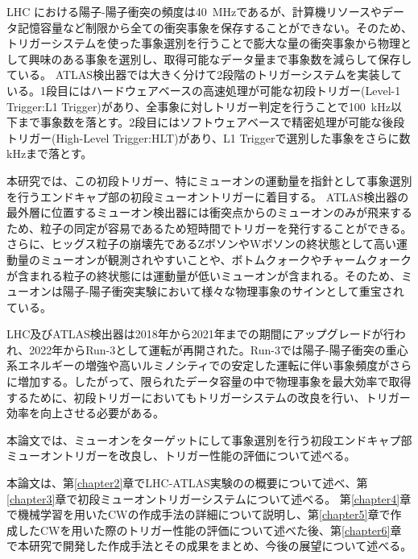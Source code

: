 LHC における陽子-陽子衝突の頻度は40~MHzであるが、計算機リソースやデータ記憶容量など制限から全ての衝突事象を保存することができない。そのため、トリガーシステムを使った事象選別を行うことで膨大な量の衝突事象から物理として興味のある事象を選別し、取得可能なデータ量まで事象数を減らして保存している。
ATLAS検出器では大きく分けて2段階のトリガーシステムを実装している。1段目にはハードウェアベースの高速処理が可能な初段トリガー(Level-1 Trigger:L1 Trigger)があり、全事象に対しトリガー判定を行うことで100~kHz以下まで事象数を落とす。2段目にはソフトウェアベースで精密処理が可能な後段トリガー(High-Level Trigger:HLT)があり、L1 Triggerで選別した事象をさらに数kHzまで落とす。

本研究では、この初段トリガー、特にミューオンの運動量を指針として事象選別を行うエンドキャプ部の初段ミューオントリガーに着目する。
ATLAS検出器の最外層に位置するミューオン検出器には衝突点からのミューオンのみが飛来するため、粒子の同定が容易であるため短時間でトリガーを発行することができる。さらに、ヒッグス粒子の崩壊先であるZボソンやWボソンの終状態として高い運動量のミューオンが観測されやすいことや、ボトムクォークやチャームクォークが含まれる粒子の終状態には運動量が低いミューオンが含まれる。そのため、ミューオンは陽子-陽子衝突実験において様々な物理事象のサインとして重宝されている。

LHC及びATLAS検出器は2018年から2021年までの期間にアップグレードが行われ、2022年からRun-3として運転が再開された。Run-3では陽子-陽子衝突の重心系エネルギーの増強や高いルミノシティでの安定した運転に伴い事象頻度がさらに増加する。したがって、限られたデータ容量の中で物理事象を最大効率で取得するために、初段トリガーにおいてもトリガーシステムの改良を行い、トリガー効率を向上させる必要がある。

本論文では、ミューオンをターゲットにして事象選別を行う初段エンドキャプ部ミューオントリガーを改良し、トリガー性能の評価について述べる。

本論文は、第\ref{chapter2}章でLHC-ATLAS実験のの概要について述べ、第\ref{chapter3}章で初段ミューオントリガーシステムについて述べる。
第\ref{chapter4}章で機械学習を用いたCWの作成手法の詳細について説明し、第\ref{chapter5}章で作成したCWを用いた際のトリガー性能の評価について述べた後、第\ref{chapter6}章で本研究で開発した作成手法とその成果をまとめ、今後の展望について述べる。


